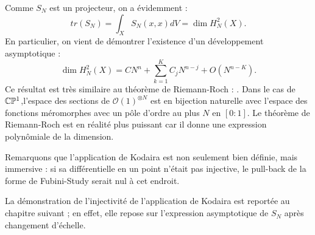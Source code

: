 \begin{rem}
Comme $S_N$ est un projecteur, on a évidemment :
\begin{equation}
  tr(S_N) = \int_XS_N(x,x)dV=\dim H^2_N(X).
\end{equation}
En particulier, on vient de démontrer l'existence d'un développement asymptotique :
\begin{equation}
  \dim H^2_N(X) = CN^n+\sum_{k=1}^{K}C_jN^{n-j} + O(N^{n-K}).
\end{equation}
Ce résultat est très similaire au théorème de Riemann-Roch : \cite{source}. Dans le cas de $\mathbb{C}\mathbb{P}^1$,l'espace des sections de $\mathcal{O}(1)^{\otimes N}$ est en bijection naturelle avec l'espace des fonctions méromorphes avec un pôle d'ordre au plus $N$ en $[0:1]$. Le théorème de Riemann-Roch est en réalité plus puissant car il donne une expression polynômiale de la dimension.
\end{rem}

Remarquons que l'application de Kodaira est non seulement bien définie, mais immersive : si sa différentielle en un point n'était pas injective, le pull-back de la forme de Fubini-Study serait nul à cet endroit.

La démonstration de l'injectivité de l'application de Kodaira est reportée au chapitre suivant ; en effet, elle repose sur l'expression asymptotique de $S_N$ après changement d'échelle.
